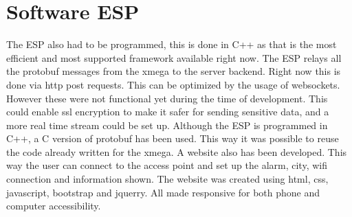\section{Software ESP}
The ESP also had to be programmed, this is done in C++ as that is the most efficient and most supported framework available right now. The ESP relays all the protobuf messages from the xmega to the server backend. Right now this is done via http post requests. This can be optimized by the usage of websockets. However these were not functional yet during the time of development. This could enable ssl encryption to make it safer for sending sensitive data, and a more real time stream could be set up. Although the ESP is programmed in C++, a C version of protobuf has been used. This way it was possible to reuse the code already written for the xmega. A website also has been developed. This way the user can connect to the access point and set up the alarm, city, wifi connection and information shown. The website was created using html, css, javascript, bootstrap and jquerry. All made responsive for both phone and computer accessibility.
